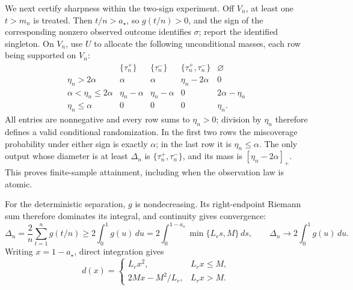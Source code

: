 We next certify sharpness within the two-sign experiment.  Off \(V_n\), at least one \(t>m_n\) is treated.  Then \(t/n>a_\star\), so \(g(t/n)>0\), and the sign of the corresponding nonzero observed outcome identifies \(\sigma\); report the identified singleton.  On \(V_n\), use \(U\) to allocate the following unconditional masses, each row being supported on \(V_n\):
\[
\begin{array}{c|cccc}
 &\{\tau_n^+\}&\{\tau_n^-\}&\{\tau_n^+,\tau_n^-\}&\varnothing\\ \hline
 \eta_n>2\alpha
   &\alpha&\alpha&\eta_n-2\alpha&0\\
 \alpha<\eta_n\le2\alpha
   &\eta_n-\alpha&\eta_n-\alpha&0&2\alpha-\eta_n\\
 \eta_n\le\alpha
   &0&0&0&\eta_n.
\end{array}
\]
All entries are nonnegative and every row sums to \(\eta_n>0\); division by \(\eta_n\) therefore defines a valid conditional randomization.  In the first two rows the miscoverage probability under either sign is exactly \(\alpha\); in the last row it is \(\eta_n\le\alpha\).  The only output whose diameter is at least \(\Delta_n\) is \(\{\tau_n^+,\tau_n^-\}\), and its mass is \([\eta_n-2\alpha]_+\).  This proves finite-sample attainment, including when the observation law is atomic.

For the deterministic separation, \(g\) is nondecreasing.  Its right-endpoint Riemann sum therefore dominates its integral, and continuity gives convergence:
\[
 \Delta_n=\frac2n\sum_{t=1}^n g(t/n)
 \ge2\int_0^1g(u)\,du
 =2\int_0^{1-a_\star}\min\{L_rs,M\}\,ds,
 \qquad
 \Delta_n\longrightarrow2\int_0^1g(u)\,du.
\]
Writing \(x=1-a_\star\), direct integration gives
\[
 d(x)=
 \begin{cases}
 L_rx^2,&L_rx\le M,\\
 2Mx-M^2/L_r,&L_rx>M.
 \end{cases}
\]

